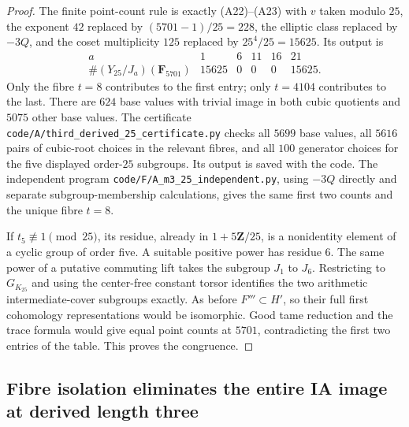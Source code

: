 \documentclass[11pt,oneside]{article}
\begin{document}
\begin{proof}
The finite point-count rule is exactly (A22)--(A23)
with $v$ taken modulo $25$, the exponent $42$
replaced by $(5701-1)/25=228$, the elliptic class
replaced by $-3Q$, and the coset multiplicity $125$
replaced by $25^4/25=15625$. Its output is
\[
\begin{array}{c|rrrrr}
 a&1&6&11&16&21\\ \hline
 \#(Y_{25}/J_a)(\mathbf F_{5701})&15625&0&0&0&15625.
\end{array}
\]
Only the fibre $t=8$ contributes to the first entry;
only $t=4104$ contributes to the last. There are $624$
base values with trivial image in both cubic quotients
and $5075$ other base values. The certificate
\texttt{code/A/third\_derived\_25\_certificate.py}
checks all $5699$ base values, all $5616$ pairs of
cubic-root choices in the relevant fibres, and all
$100$ generator choices for the five displayed
order-$25$ subgroups. Its output is saved with the code.
The independent program
\texttt{code/F/A\_m3\_25\_independent.py}, using $-3Q$
directly and separate subgroup-membership calculations,
gives the same first two counts and the unique fibre $t=8$.

If $t_5\not\equiv1\pmod{25}$, its residue, already in
$1+5\mathbf Z/25$, is a nonidentity element of a
cyclic group of order five. A suitable positive power
has residue $6$. The same power of a putative commuting
lift takes the subgroup $J_1$ to $J_6$. Restricting to
$G_{K_{25}}$ and using the center-free constant torsor
identifies the two arithmetic intermediate-cover
subgroups exactly. As before $F'''\subset H'$,
so their full first cohomology representations would
be isomorphic. Good tame reduction and the trace
formula would give equal point counts at $5701$,
contradicting the first two entries of the table.
This proves the congruence.
\end{proof}

\subsection{Fibre isolation eliminates the entire IA image at derived length three}
\end{document}

